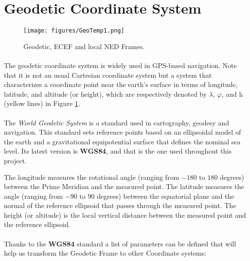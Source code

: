 \section{Geodetic Coordinate System}\label{sec:geodetic}

\begin{figure}[H]
   \centering
    \texttt{[image: figures/GeoTemp1.png]} 
    \caption{Geodetic, ECEF and local NED Frames.}  
    \label{fig:Geodetic1}
\end{figure}

\paragraph{}The geodetic coordinate system is widely used in GPS-based navigation. Note that it is not an usual Cartesian coordinate system but a system that characterizes a coordinate point near the earth’s surface in terms of longitude, latitude, and altitude (or height), which are respectively denoted by $\lambda$, $\varphi$, and h (yellow lines) in Figure \ref{fig:Geodetic1}.

\paragraph{}The \textit{World Geodetic System} is a standard used in cartography, geodesy and navigation. This standard sets reference points based on an ellipsoidal model of the earth and a gravitational equipotential surface that defines the nominal sea level. Its latest version is \textbf{WGS84}, and that is the one used throughout this project. 

The longitude measures the rotational angle (ranging from $-180$ to $180$ degrees) between the Prime Meridian and the measured point. The latitude measures the angle (ranging from $-90$ to $90$ degrees) between the equatorial plane and the normal of the reference ellipsoid that passes through the measured point. The height (or altitude) is the local vertical distance between the measured point and the reference ellipsoid.

\paragraph{}Thanks to the \textbf{WGS84} standard a list of parameters can be defined that will help us transform the Geodetic Frame to other Coordinate systems:

